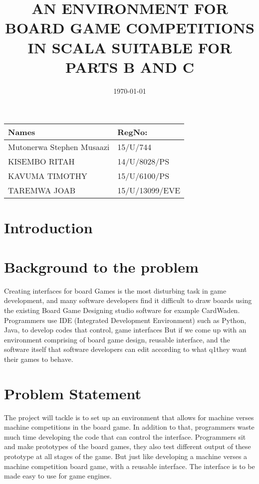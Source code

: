 \documentclass[a4paper,12pt]{article}
\begin{document}
\title{AN ENVIRONMENT FOR BOARD GAME COMPETITIONS IN SCALA SUITABLE FOR PARTS B AND C}
\date{\today}

\begin{tabular}{|l|l|}
\hline
Names & RegNo: \\
\hline
Mutonerwa Stephen Musaazi & 15/U/744 \\
\hline
 KISEMBO RITAH & 14/U/8028/PS \\
\hline
 KAVUMA TIMOTHY	& 15/U/6100/PS \\ 
\hline
 TAREMWA JOAB	& 15/U/13099/EVE \\
\hline
\end{tabular}


\maketitle
{}

\newpage
\section{Introduction}
\section{  Background to the problem}

Creating interfaces for board Games is the most disturbing task in game development, and many software developers find it difficult to draw boards using the existing Board Game Designing  studio software for example CardWaden. 
Programmers use IDE (Integrated Development Environment) such as Python, Java, to develop codes that control, game interfaces
But if we come up with an environment comprising of board game design, reusable interface, and the software itself that software developers can edit according to what q1they want their games to behave.

\section{ Problem Statement}
The project will tackle is to set up an environment that allows for machine verses machine competitions in the board game.  
In addition to that, programmers waste much time developing the code that can control the interface. Programmers sit and make prototypes of the board games, they also test different output of these prototype at all stages of the game.
But just like developing a machine verses a machine competition board game, with a reusable interface.  The interface is to be made easy to use for game engines.
\end{document}
